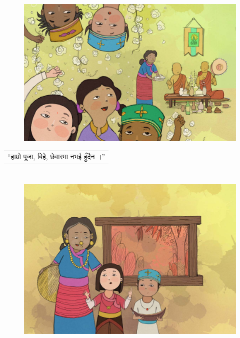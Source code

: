 \documentclass[
  letterpaper,
  DIV=11,
  numbers=noendperiod,
  paper=6in:9in,
  pagesize=pdftex,
  headinclude=on,
  footinclude=on,
  12pt]{scrreprt}
\begin{document}
\hypertarget{img}{}
\begin{figure}[H]

{\centering \includegraphics{images/p-6.jpg}

}

\end{figure}

\hypertarget{p}{}
\begin{longtable}[]{@{}l@{}}
\toprule\noalign{}
\endhead
\bottomrule\noalign{}
\endlastfoot
``हाम्रो पूजा, बिहे, छेवारमा नभई हुँदैन ।'' \\
\end{longtable}


\hypertarget{section-5}{%
\chapter{}\label{section-5}}

\hypertarget{img}{}
\begin{figure}[H]

{\centering \includegraphics{images/p-7.jpg}

}

\end{figure}
\end{document}
